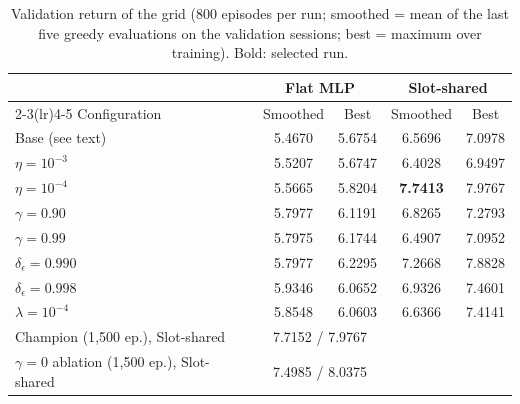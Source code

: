 \begin{table}[t]
\centering
\caption{Validation return of the grid (800 episodes per run; smoothed = mean of the last five greedy evaluations on the validation sessions; best = maximum over training). Bold: selected run.}
\label{tab:hyperparameters}
\footnotesize
\setlength{\tabcolsep}{3pt}
\begin{tabular}{@{}l cc cc@{}}
\toprule
 & \multicolumn{2}{c}{Flat MLP} & \multicolumn{2}{c}{Slot-shared} \\
\cmidrule(lr){2-3}\cmidrule(lr){4-5}
Configuration & Smoothed & Best & Smoothed & Best \\
\midrule
Base (see text) & 5.4670 & 5.6754 & 6.5696 & 7.0978 \\
$\eta = 10^{-3}$ & 5.5207 & 5.6747 & 6.4028 & 6.9497 \\
$\eta = 10^{-4}$ & 5.5665 & 5.8204 & \textbf{7.7413} & 7.9767 \\
$\gamma = 0.90$ & 5.7977 & 6.1191 & 6.8265 & 7.2793 \\
$\gamma = 0.99$ & 5.7975 & 6.1744 & 6.4907 & 7.0952 \\
$\delta_\epsilon = 0.990$ & 5.7977 & 6.2295 & 7.2668 & 7.8828 \\
$\delta_\epsilon = 0.998$ & 5.9346 & 6.0652 & 6.9326 & 7.4601 \\
$\lambda = 10^{-4}$ & 5.8548 & 6.0603 & 6.6366 & 7.4141 \\
\midrule
Champion (1{,}500 ep.), Slot-shared & \multicolumn{2}{c}{7.7152 / 7.9767} & & \\
$\gamma = 0$ ablation (1{,}500 ep.), Slot-shared & \multicolumn{2}{c}{7.4985 / 8.0375} & & \\
\bottomrule
\end{tabular}
\end{table}
